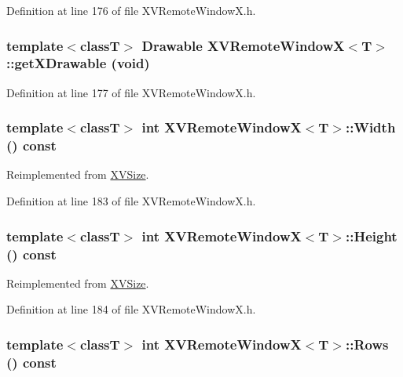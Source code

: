 Definition at line 176 of file XVRemote\-Window\-X.h.\label{XVRemoteWindowX_a31}
\hypertarget{class_XVRemoteWindowX_a31}{
\subsubsection[getXDrawable]{\setlength{\rightskip}{0pt plus 5cm}template$<$classT$>$ Drawable XVRemote\-Window\-X$<$T$>$::get\-XDrawable (void)}}




Definition at line 177 of file XVRemote\-Window\-X.h.\label{XVRemoteWindowX_a32}
\hypertarget{class_XVRemoteWindowX_a32}{
\subsubsection[Width]{\setlength{\rightskip}{0pt plus 5cm}template$<$classT$>$ int XVRemote\-Window\-X$<$T$>$::Width () const}}




Reimplemented from \hyperlink{class_XVSize}{XVSize}.

Definition at line 183 of file XVRemote\-Window\-X.h.\label{XVRemoteWindowX_a33}
\hypertarget{class_XVRemoteWindowX_a33}{
\subsubsection[Height]{\setlength{\rightskip}{0pt plus 5cm}template$<$classT$>$ int XVRemote\-Window\-X$<$T$>$::Height () const}}




Reimplemented from \hyperlink{class_XVSize}{XVSize}.

Definition at line 184 of file XVRemote\-Window\-X.h.\label{XVRemoteWindowX_a34}
\hypertarget{class_XVRemoteWindowX_a34}{
\subsubsection[Rows]{\setlength{\rightskip}{0pt plus 5cm}template$<$classT$>$ int XVRemote\-Window\-X$<$T$>$::Rows () const}}




